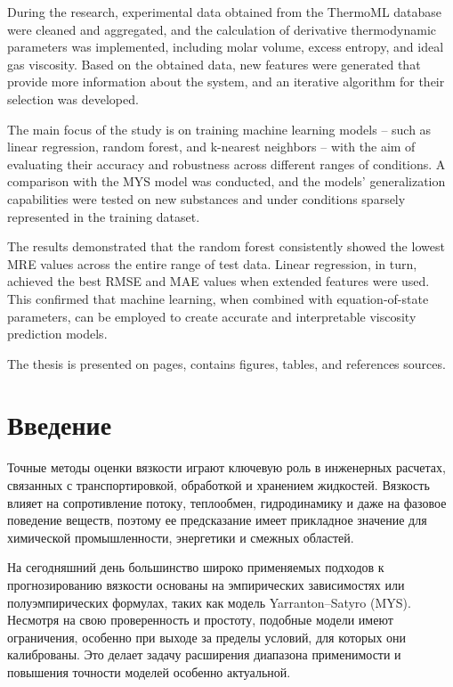 \documentclass[a4paper,12pt]{article}
\begin{document}
  During the research, experimental data obtained from the ThermoML database were cleaned and aggregated, and the calculation of derivative thermodynamic parameters was implemented, including molar volume, excess entropy, and ideal gas viscosity. Based on the obtained data, new features were generated that provide more information about the system, and an iterative algorithm for their selection was developed.

  The main focus of the study is on training machine learning models -- such as linear regression, random forest, and k-nearest neighbors -- with the aim of evaluating their accuracy and robustness across different ranges of conditions. A comparison with the MYS model was conducted, and the models' generalization capabilities were tested on new substances and under conditions sparsely represented in the training dataset.

  The results demonstrated that the random forest consistently showed the lowest MRE values across the entire range of test data. Linear regression, in turn, achieved the best RMSE and MAE values when extended features were used. This confirmed that machine learning, when combined with equation-of-state parameters, can be employed to create accurate and interpretable viscosity prediction models.

  The thesis is presented on \pageref{LastPage} pages, contains  figures,  tables, and references  sources.

\newpage

\tableofcontents
\newpage

\section*{Введение}
  Точные методы оценки вязкости играют ключевую роль в инженерных расчетах, связанных с транспортировкой, обработкой и хранением жидкостей. Вязкость влияет на сопротивление потоку, теплообмен, гидродинамику и даже на фазовое поведение веществ, поэтому ее предсказание имеет прикладное значение для химической промышленности, энергетики и смежных областей.
  
  На сегодняшний день большинство широко применяемых подходов к прогнозированию вязкости основаны на эмпирических зависимостях или полуэмпирических формулах, таких как модель Yarranton–Satyro (MYS). Несмотря на свою проверенность и простоту, подобные модели имеют ограничения, особенно при выходе за пределы условий, для которых они калиброваны. Это делает задачу расширения диапазона применимости и повышения точности моделей особенно актуальной.
  
\end{document}
